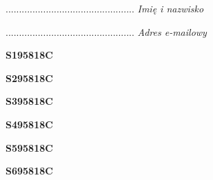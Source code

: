 \begin{turn}{90}\begin{minipage}{\linewidth} \vspace{20mm} ................................................  \textit{Imię i nazwisko}\end{minipage}\end{turn}

\begin{turn}{90}\begin{minipage}{\linewidth} \vspace{20mm} ................................................  \textit{Adres e-mailowy}\end{minipage}\end{turn}

\begin{turn}{90}\huge \begin{minipage}{\linewidth} \vspace{10mm}\textbf{S195818C}\end{minipage}\end{turn}

\begin{turn}{90}\huge \begin{minipage}{\linewidth} \vspace{10mm}\textbf{S295818C}\end{minipage}\end{turn}

\begin{turn}{90}\huge \begin{minipage}{\linewidth} \vspace{10mm}\textbf{S395818C}\end{minipage}\end{turn}

\begin{turn}{90}\huge \begin{minipage}{\linewidth} \vspace{10mm}\textbf{S495818C}\end{minipage}\end{turn}

\begin{turn}{90}\huge \begin{minipage}{\linewidth} \vspace{10mm}\textbf{S595818C}\end{minipage}\end{turn}

\begin{turn}{90}\huge \begin{minipage}{\linewidth} \vspace{10mm}\textbf{S695818C}\end{minipage}\end{turn}

